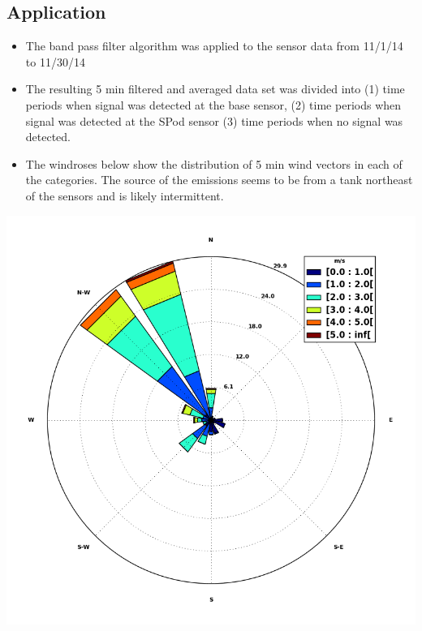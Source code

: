 \documentclass[a0, landscape]{a0poster}
\begin{document}
\begin{multicols}{3}
\subsection*{Application}
\begin{itemize}
 \item The band pass filter algorithm was applied to the sensor data from 11/1/14 to 11/30/14 
 \item The resulting 5 min filtered and averaged data set was divided into (1) time periods when signal was detected at the base sensor, (2) time periods when signal was detected at the SPod sensor (3) time periods when no signal was detected.
 \item The windroses below show the distribution of 5 min wind vectors in each of the categories. The source of the emissions seems to be from a tank northeast of the sensors and is likely intermittent. 
\end{itemize} 
\begin{minipage}{.08\textwidth}
	\begin{center}			
		\includegraphics[width=\linewidth]{windrose_Base}
	\end{center}
\end{minipage}
\hfill
\begin{minipage}{.08\textwidth}	

\end{minipage}
\end{multicols}
\end{document}
